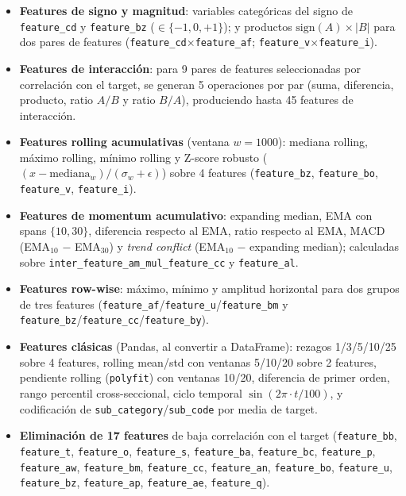 \documentclass{article}
\begin{document}
\begin{itemize}
    \item \textbf{Features de signo y magnitud}: variables categóricas del signo de \texttt{feature\_cd} y \texttt{feature\_bz} ($\in \{-1, 0, +1\}$); y productos $\mathrm{sign}(A) \times |B|$ para dos pares de features (\texttt{feature\_cd}$\times$\texttt{feature\_af}; \texttt{feature\_v}$\times$\texttt{feature\_i}).
    \item \textbf{Features de interacción}: para 9 pares de features seleccionadas por correlación con el target, se generan 5 operaciones por par (suma, diferencia, producto, ratio $A/B$ y ratio $B/A$), produciendo hasta 45 features de interacción.
    \item \textbf{Features rolling acumulativas} (ventana $w=1000$): mediana rolling, máximo rolling, mínimo rolling y Z-score robusto ($(x - \text{mediana}_{w}) / (\sigma_w + \epsilon)$) sobre 4 features (\texttt{feature\_bz}, \texttt{feature\_bo}, \texttt{feature\_v}, \texttt{feature\_i}).
    \item \textbf{Features de momentum acumulativo}: expanding median, EMA con spans $\{10, 30\}$, diferencia respecto al EMA, ratio respecto al EMA, MACD (EMA$_{10}$ $-$ EMA$_{30}$) y \emph{trend conflict} (EMA$_{10}$ $-$ expanding median); calculadas sobre \texttt{inter\_feature\_am\_mul\_feature\_cc} y \texttt{feature\_al}.
    \item \textbf{Features row-wise}: máximo, mínimo y amplitud horizontal para dos grupos de tres features (\texttt{feature\_af}/\texttt{feature\_u}/\texttt{feature\_bm} y \texttt{feature\_bz}/\texttt{feature\_cc}/\texttt{feature\_by}).
    \item \textbf{Features clásicas} (Pandas, al convertir a DataFrame): rezagos 1/3/5/10/25 sobre 4 features, rolling mean/std con ventanas 5/10/20 sobre 2 features, pendiente rolling (\texttt{polyfit}) con ventanas 10/20, diferencia de primer orden, rango percentil cross-seccional, ciclo temporal $\sin(2\pi \cdot t / 100)$, y codificación de \texttt{sub\_category}/\texttt{sub\_code} por media de target.
    \item \textbf{Eliminación de 17 features} de baja correlación con el target (\texttt{feature\_bb}, \texttt{feature\_t}, \texttt{feature\_o}, \texttt{feature\_s}, \texttt{feature\_ba}, \texttt{feature\_bc}, \texttt{feature\_p}, \texttt{feature\_aw}, \texttt{feature\_bm}, \texttt{feature\_cc}, \texttt{feature\_an}, \texttt{feature\_bo}, \texttt{feature\_u}, \texttt{feature\_bz}, \texttt{feature\_ap}, \texttt{feature\_ae}, \texttt{feature\_q}).
\end{itemize}
\end{document}
